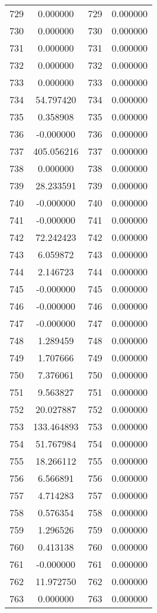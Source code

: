 \documentclass[12pt]{article}
\begin{document}
\begin{longtable}{@{}cccc@{}}
729 & 0.000000 & 729 & 0.000000 \\
730 & 0.000000 & 730 & 0.000000 \\
731 & 0.000000 & 731 & 0.000000 \\
732 & 0.000000 & 732 & 0.000000 \\
733 & 0.000000 & 733 & 0.000000 \\
734 & 54.797420 & 734 & 0.000000 \\
735 & 0.358908 & 735 & 0.000000 \\
736 & -0.000000 & 736 & 0.000000 \\
737 & 405.056216 & 737 & 0.000000 \\
738 & 0.000000 & 738 & 0.000000 \\
739 & 28.233591 & 739 & 0.000000 \\
740 & -0.000000 & 740 & 0.000000 \\
741 & -0.000000 & 741 & 0.000000 \\
742 & 72.242423 & 742 & 0.000000 \\
743 & 6.059872 & 743 & 0.000000 \\
744 & 2.146723 & 744 & 0.000000 \\
745 & -0.000000 & 745 & 0.000000 \\
746 & -0.000000 & 746 & 0.000000 \\
747 & -0.000000 & 747 & 0.000000 \\
748 & 1.289459 & 748 & 0.000000 \\
749 & 1.707666 & 749 & 0.000000 \\
750 & 7.376061 & 750 & 0.000000 \\
751 & 9.563827 & 751 & 0.000000 \\
752 & 20.027887 & 752 & 0.000000 \\
753 & 133.464893 & 753 & 0.000000 \\
754 & 51.767984 & 754 & 0.000000 \\
755 & 18.266112 & 755 & 0.000000 \\
756 & 6.566891 & 756 & 0.000000 \\
757 & 4.714283 & 757 & 0.000000 \\
758 & 0.576354 & 758 & 0.000000 \\
759 & 1.296526 & 759 & 0.000000 \\
760 & 0.413138 & 760 & 0.000000 \\
761 & -0.000000 & 761 & 0.000000 \\
762 & 11.972750 & 762 & 0.000000 \\
763 & 0.000000 & 763 & 0.000000 \\

\end{longtable}
\end{document}

